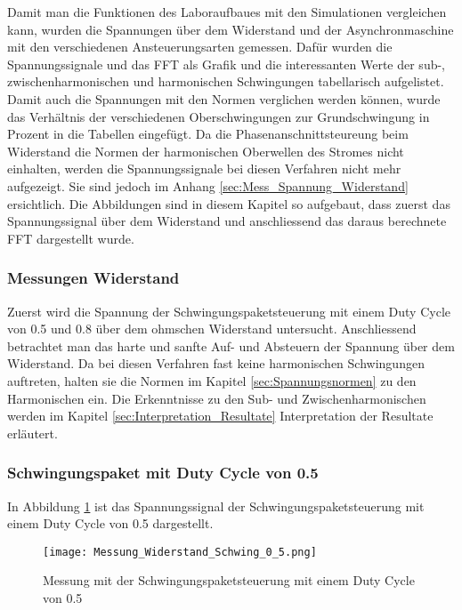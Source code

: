 Damit man die Funktionen des Laboraufbaues mit den Simulationen vergleichen kann, wurden die Spannungen über dem Widerstand und der Asynchronmaschine mit den verschiedenen Ansteuerungsarten gemessen. Dafür wurden die Spannungssignale und das FFT als Grafik und die interessanten Werte der sub-, zwischenharmonischen und harmonischen Schwingungen tabellarisch aufgelistet. Damit auch die Spannungen mit den Normen verglichen werden können, wurde das Verhältnis der verschiedenen Oberschwingungen zur Grundschwingung in Prozent in die Tabellen eingefügt. Da die Phasenanschnittsteureung beim Widerstand die Normen der harmonischen Oberwellen des Stromes nicht einhalten, werden die Spannungssignale bei diesen Verfahren nicht mehr aufgezeigt. Sie sind jedoch im Anhang \ref{sec:Mess_Spannung_Widerstand} ersichtlich. Die Abbildungen sind in diesem Kapitel so aufgebaut, dass zuerst das Spannungssignal über dem Widerstand und anschliessend das daraus berechnete FFT dargestellt wurde.

\subsubsection{Messungen Widerstand}

Zuerst wird die Spannung der Schwingungspaketsteuerung mit einem Duty Cycle von 0.5 und 0.8 über dem ohmschen Widerstand untersucht. Anschliessend betrachtet man das harte und sanfte Auf- und Absteuern der Spannung über dem Widerstand. Da bei diesen Verfahren fast keine harmonischen Schwingungen auftreten, halten sie die Normen im Kapitel \ref{sec:Spannungsnormen} zu den Harmonischen ein. Die Erkenntnisse zu den Sub- und Zwischenharmonischen werden im Kapitel \ref{sec:Interpretation_Resultate} Interpretation der Resultate erläutert.

\subsubsection*{Schwingungspaket mit Duty Cycle von 0.5}

In Abbildung \ref{fig:Mess_Schwing_50} ist das Spannungssignal der Schwingungspaketsteuerung mit einem Duty Cycle von 0.5 dargestellt.


\begin{figure}[ht!]
	\centering
	\texttt{[image: Messung\_Widerstand\_Schwing\_0\_5.png]}	
	\caption{Messung mit der Schwingungspaketsteuerung mit einem Duty Cycle von 0.5}\label{fig:Mess_Schwing_50}
\end{figure}


